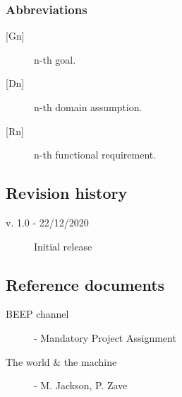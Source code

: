 \subsubsection{Abbreviations}

\begin{description}
    \item [{[Gn]}] n-th goal.
    \item [{[Dn]}] n-th domain assumption.
    \item [{[Rn]}] n-th functional requirement.
\end{description}

\subsection{Revision history}

\begin{description}
    \item[v. 1.0 - 22/12/2020] Initial release
\end{description} 

\subsection{Reference documents}

\begin{description}
    \item [BEEP channel] - Mandatory Project Assignment
    \item [The world \& the machine] - M. Jackson, P. Zave
\end{description}


